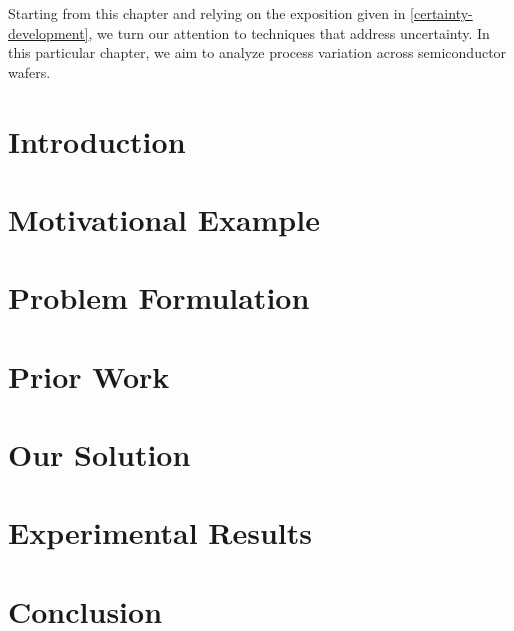 Starting from this chapter and relying on the exposition given in
\cref{certainty-development}, we turn our attention to techniques that address
uncertainty. In this particular chapter, we aim to analyze process variation
across semiconductor wafers.

\section{Introduction}

\section{Motivational Example}

\section{Problem Formulation}

\section{Prior Work}

\section{Our Solution}

\section{Experimental Results}

\section{Conclusion}
